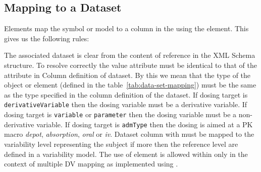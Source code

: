 \subsection{Mapping to a Dataset}

Elements map the symbol or model to a column in the 
using the  element. This gives us the following rules:

\begin{valrules}
   The associated dataset is clear
  from the content of reference in the XML Schema structure. To
  resolve correctly the value  attribute must be identical
  to that of the  attribute in Column definition of
  dataset.
 By this we mean that the type of
the object or element (defined in the table~\ref{tab:data-set-mapping}) must be the same as
the type specified in the column definition of the dataset.
 If dosing target is 
\texttt{derivativeVariable} then the dosing variable must be a
derivative variable.
 If dosing target is 
\texttt{variable} or \texttt{parameter} then the dosing variable must be a
non-derivative variable.
 If dosing target is \texttt{admType} 
then the dosing is aimed at a PK macro \emph{depot}, \emph{absorption}, 
\emph{oral} or \emph{iv}.
 Dataset column 
with  must be mapped to the variability level representing
the subject if more then the reference level are defined in a variability model.
 The use of  element
is allowed within  only in the context of multiple DV mapping
as implemented using .
\end{valrules}

%


